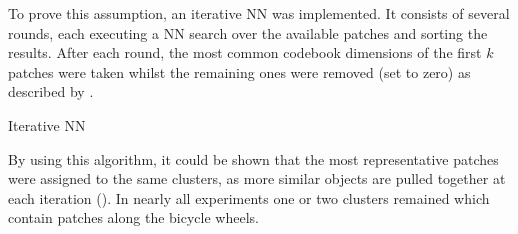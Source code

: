 To prove this assumption, an iterative \ac{NN} was implemented. It consists of several rounds, each executing a \ac{NN} search over the available patches and sorting the results. After each round, the most common codebook dimensions of the first $k$ patches were taken whilst the remaining ones were removed (set to zero) as described by .

\begin{algorithm}
	\caption{Iterative \acs{NN}}
	\label{alg:iterative_nn}
\end{algorithm}

By using this algorithm, it could be shown that the most representative patches were assigned to the same clusters, as more similar objects are pulled together at each iteration (). In nearly all experiments one or two clusters remained which contain patches along the bicycle wheels.




